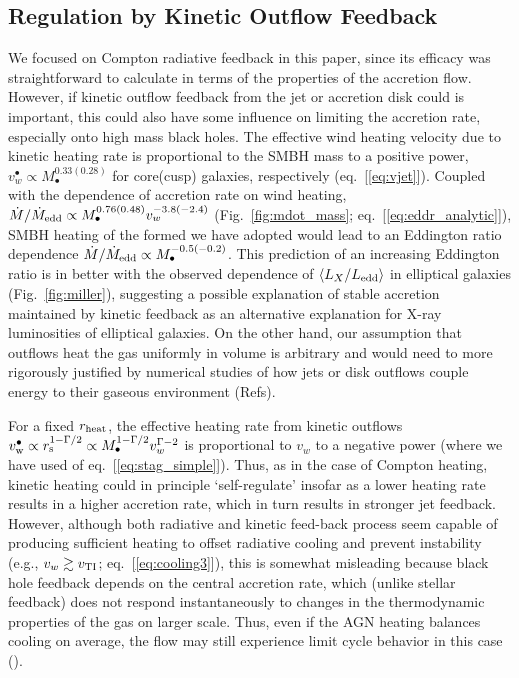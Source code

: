 \documentclass[usenatbib,fleqn]{mn2e}
\begin{document}
\subsection{Regulation by Kinetic Outflow Feedback}
\label{sec:kinetic}

We focused on Compton radiative feedback in this paper, since its
efficacy was straightforward to calculate in terms of the properties
of the accretion flow.  However, if kinetic outflow feedback from the
jet or accretion disk could is important, this could also have some
influence on limiting the accretion rate, especially onto high mass
black holes.  The effective wind heating velocity due to kinetic
heating rate is proportional to the SMBH mass to a positive power,
$v_{w}^{\bullet} \propto M_{\bullet}^{0.33(0.28)}$ for core(cusp)
galaxies, respectively (eq.~[\ref{eq:vjet}]).  Coupled with the
dependence of accretion rate on wind heating, $\dot{M}/\dot{M}_{\rm
  edd} \propto M_{\bullet}^{0.76(0.48)}v_{w}^{-3.8(-2.4)}$
(Fig.~\ref{fig:mdot_mass}; eq.~[\ref{eq:eddr_analytic}]), SMBH heating
of the formed we have adopted would lead to an Eddington ratio
dependence $\dot{M}/\dot{M}_{\rm edd} \propto
M_{\bullet}^{-0.5(-0.2)}$.  This prediction of an increasing Eddington
ratio is in better with the observed dependence of $\langle
L_{X}/L_{\rm edd} \rangle$ in elliptical galaxies
(Fig.~\ref{fig:miller}), suggesting a possible explanation of stable
accretion maintained by kinetic feedback as an alternative explanation
for X-ray luminosities of elliptical galaxies.  On the other hand, our
assumption that outflows heat the gas uniformly in volume is arbitrary
and would need to more rigorously justified by numerical studies of
how jets or disk outflows couple energy to their gaseous environment
(Refs).

For a fixed $r_{\rm heat}$, the effective heating rate from kinetic outflows $v_{\rm w}^{\bullet} \propto r_{\rm s}^{1-\Gamma/2} \propto M_{\bullet}^{1-\Gamma/2}v_{w}^{\Gamma-2}$ is proportional to $v_{w}$
to a negative power (where we have used of eq.~[\ref{eq:stag_simple}]).  Thus, as in the case of Compton heating, kinetic heating could in principle  `self-regulate' insofar as a lower heating rate results in a higher accretion rate, which in turn results in stronger jet feedback.  
However, although both radiative and kinetic feed-back process seem capable of producing sufficient heating to offset radiative cooling and prevent instability (e.g., $v_w \gtrsim v_{\rm TI}$; eq.~[\ref{eq:cooling3}]), this is somewhat misleading because black hole feedback depends on the central accretion rate, which (unlike stellar feedback) does not respond instantaneously to changes in the thermodynamic properties of the gas on larger scale.  Thus, even if the AGN heating balances cooling on average, the flow may still experience limit cycle behavior in this case (\citealt{Yuan&Li11}).   
\end{document}
